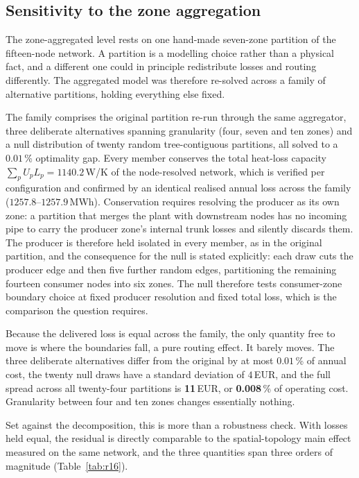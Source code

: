 
\subsection{Sensitivity to the zone aggregation}
\label{subsec:clustering}

The zone-aggregated level rests on one hand-made seven-zone partition of the fifteen-node
network. A partition is a modelling choice rather than a physical fact, and a different one
could in principle redistribute losses and routing differently. The aggregated model was
therefore re-solved across a family of alternative partitions, holding everything else fixed.

The family comprises the original partition re-run through the same aggregator, three
deliberate alternatives spanning granularity (four, seven and ten zones) and a null
distribution of twenty random tree-contiguous partitions, all solved to a $0.01$\,\%
optimality gap. Every member conserves the total heat-loss capacity
$\sum_p U_p L_p = 1140.2$\,W/K of the node-resolved network, which is verified per
configuration and confirmed by an identical realised annual loss across the family
($1257.8$--$1257.9$\,MWh). Conservation requires resolving the producer as its own zone: a
partition that merges the plant with downstream nodes has no incoming pipe to carry the
producer zone's internal trunk losses and silently discards them. The producer is therefore held
isolated in every member, as in the original partition, and the consequence for the null is
stated explicitly: each draw cuts the producer edge and then
five further random edges, partitioning the remaining fourteen consumer nodes into six
zones. The null therefore tests consumer-zone boundary choice at fixed producer resolution
and fixed total loss, which is the comparison the question requires.

Because the delivered loss is equal across the family, the only quantity free to move is
where the boundaries fall, a pure routing effect. It barely moves. The three deliberate
alternatives differ from the original by at most $0.01$\,\% of annual cost, the twenty null
draws have a standard deviation of $4$\,EUR, and the full spread across all twenty-four
partitions is \textbf{11}\,EUR, or \textbf{0.008}\,\% of operating cost. Granularity between
four and ten zones changes essentially nothing.

Set against the decomposition, this is more than a robustness check. With losses held
equal, the residual is directly comparable to the spatial-topology main effect measured on
the same network, and the three quantities span three orders of magnitude
(Table~\ref{tab:r16}).

